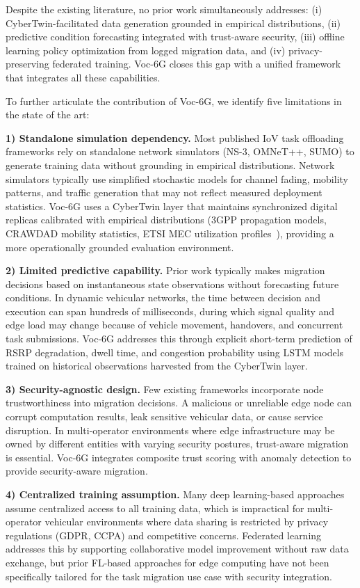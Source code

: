 \documentclass[10pt,letterpaper]{article}
\providecommand{\VocSixG}{Voc-6G}
\begin{document}
Despite the existing literature, no prior work simultaneously addresses: (i) CyberTwin-facilitated data generation grounded in empirical distributions, (ii) predictive condition forecasting integrated with trust-aware security, (iii) offline learning policy optimization from logged migration data, and (iv) privacy-preserving federated training. \VocSixG{} closes this gap with a unified framework that integrates all these capabilities.

To further articulate the contribution of \VocSixG{}, we identify five limitations in the state of the art:

\textbf{1) Standalone simulation dependency.} Most published IoV task offloading frameworks rely on standalone network simulators (NS-3, OMNeT++, SUMO) to generate training data without grounding in empirical distributions. Network simulators typically use simplified stochastic models for channel fading, mobility patterns, and traffic generation that may not reflect measured deployment statistics. \VocSixG{} uses a CyberTwin layer that maintains synchronized digital replicas calibrated with empirical distributions (3GPP propagation models, CRAWDAD mobility statistics, ETSI MEC utilization profiles~\cite{etsi_mec003}), providing a more operationally grounded evaluation environment.

\textbf{2) Limited predictive capability.} Prior work typically makes migration decisions based on instantaneous state observations without forecasting future conditions. In dynamic vehicular networks, the time between decision and execution can span hundreds of milliseconds, during which signal quality and edge load may change because of vehicle movement, handovers, and concurrent task submissions. \VocSixG{} addresses this through explicit short-term prediction of RSRP degradation, dwell time, and congestion probability using LSTM models trained on historical observations harvested from the CyberTwin layer.

\textbf{3) Security-agnostic design.} Few existing frameworks incorporate node trustworthiness into migration decisions. A malicious or unreliable edge node can corrupt computation results, leak sensitive vehicular data, or cause service disruption. In multi-operator environments where edge infrastructure may be owned by different entities with varying security postures, trust-aware migration is essential. \VocSixG{} integrates composite trust scoring with anomaly detection to provide security-aware migration.

\textbf{4) Centralized training assumption.} Many deep learning-based approaches assume centralized access to all training data, which is impractical for multi-operator vehicular environments where data sharing is restricted by privacy regulations (GDPR, CCPA) and competitive concerns. Federated learning addresses this by supporting collaborative model improvement without raw data exchange, but prior FL-based approaches for edge computing have not been specifically tailored for the task migration use case with security integration.
\end{document}
